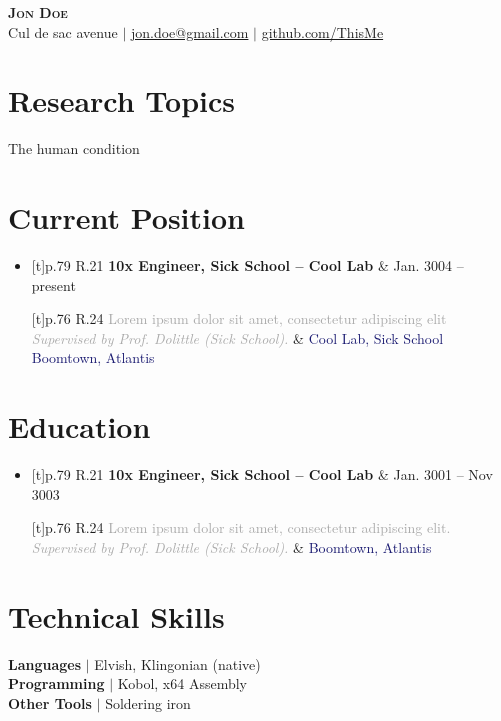\documentclass[letterpaper,10pt]{article}
\newcommand{\Subheading}[4]{
  \vspace{1pt}\item
    \begin{tabularx}{\textwidth}[t]{p{.79\linewidth} R{.21\linewidth}}
      \textbf{#1} & #2
    \end{tabularx}
    \SubTable{#3}{#4}\vspace{-5pt}
}
\newcommand{\SubTable}[2]{
    \begin{tabularx}{\textwidth}[t]{p{.76\linewidth} R{.24\linewidth}}
        \small{\textcolor{darkgray}{#2}} & \textcolor{MidnightBlue}{\small #1} \\
    \end{tabularx}
}
\newcommand{\skillLine}[2]{\textbf{#1} $|$ #2\\\smallskip}
\newcommand{\SubHeadingListStart}{\begin{itemize}[
    leftmargin=0in, label={}]}
\newcommand{\SubHeadingListEnd}{\end{itemize}}
\newcommand{\hreff}[2]{\textcolor{blue}{\href{#1}{#2}}}
\begin{document}

\begin{center}
    \textbf{\Huge \scshape Jon Doe} \\ \vspace{10pt}
    \small Cul de sac avenue $|$ \hreff{mailto:jon.doe@gmail.com}{jon.doe@gmail.com} $|$ 
    \hreff{https://github.com/ThisMe}{github.com/ThisMe}
\end{center}

\section{Research Topics}
\begin{center}
    \large
    The human condition
\end{center}


\section{Current Position}
\SubHeadingListStart
    \Subheading
        {10x Engineer, Sick School – Cool Lab}{Jan. 3004 -- present}{
            \hspace*{\fill}Cool Lab,\newline
            \hspace*{\fill}Sick School\newline
            \hspace*{\fill}Boomtown, Atlantis
        }{
            Lorem ipsum dolor sit amet, consectetur adipiscing elit \newline\textit{Supervised by Prof. Dolittle (Sick School).}
        }
\SubHeadingListEnd

\section{Education}
    \SubHeadingListStart
        \Subheading{10x Engineer, Sick School – Cool Lab}{Jan. 3001 -- Nov 3003}{Boomtown, Atlantis}{
            Lorem ipsum dolor sit amet, consectetur adipiscing elit.
            \newline\textit{Supervised by Prof. Dolittle (Sick School).}
        }     
  \SubHeadingListEnd

\section{Technical Skills}
 \begin{itemize}[leftmargin=0in, label={}]
    \small{\item{
        \skillLine{Languages}{Elvish, Klingonian (native)}
        \skillLine{Programming}{Kobol, x64 Assembly}
        \skillLine{Other Tools}{Soldering iron}
    }}
 \end{itemize}
\end{document}
